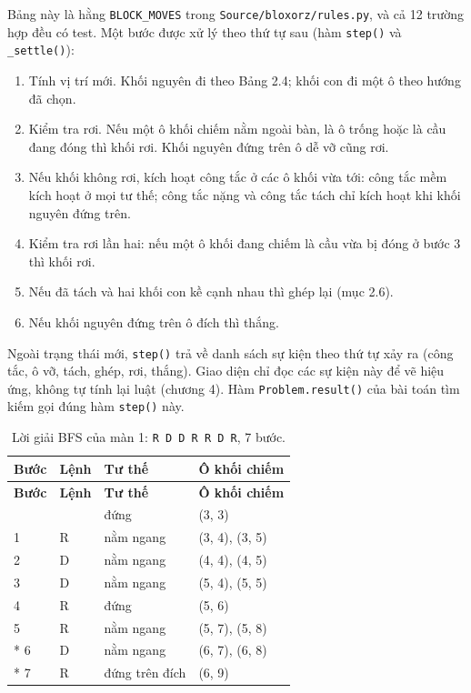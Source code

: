 Bảng này là hằng \texttt{BLOCK\_\allowbreak{}MOVES} trong \texttt{Source/\allowbreak{}bloxorz/\allowbreak{}rules.\allowbreak{}py}, và cả 12 trường hợp đều có test. Một bước được xử lý theo thứ tự sau (hàm \texttt{step()} và \texttt{\_\allowbreak{}settle()}):

\begin{enumerate}
\def\labelenumi{\arabic{enumi}.}
\tightlist
\item
  Tính vị trí mới. Khối nguyên đi theo Bảng 2.4; khối con đi một ô theo hướng đã chọn.
\item
  Kiểm tra rơi. Nếu một ô khối chiếm nằm ngoài bàn, là ô trống hoặc là cầu đang đóng thì khối rơi. Khối nguyên đứng trên ô dễ vỡ cũng rơi.
\item
  Nếu khối không rơi, kích hoạt công tắc ở các ô khối vừa tới: công tắc mềm kích hoạt ở mọi tư thế; công tắc nặng và công tắc tách chỉ kích hoạt khi khối nguyên đứng trên.
\item
  Kiểm tra rơi lần hai: nếu một ô khối đang chiếm là cầu vừa bị đóng ở bước 3 thì khối rơi.
\item
  Nếu đã tách và hai khối con kề cạnh nhau thì ghép lại (mục 2.6).
\item
  Nếu khối nguyên đứng trên ô đích thì thắng.
\end{enumerate}

Ngoài trạng thái mới, \texttt{step()} trả về danh sách sự kiện theo thứ tự xảy ra (công tắc, ô vỡ, tách, ghép, rơi, thắng). Giao diện chỉ đọc các sự kiện này để vẽ hiệu ứng, không tự tính lại luật (chương 4). Hàm \texttt{Problem.\allowbreak{}result()} của bài toán tìm kiếm gọi đúng hàm \texttt{step()} này.

\begin{longtable}[]{@{}llll@{}}
\caption{ Lời giải BFS của màn 1: \texttt{R D D R R D R}, 7 bước.}\tabularnewline
\toprule\noalign{}
\rowcolor{tablehead}\textbf{Bước} & \textbf{Lệnh} & \textbf{Tư thế} & \textbf{Ô khối chiếm} \\
\midrule\noalign{}
\endfirsthead
\toprule\noalign{}
\rowcolor{tablehead}\textbf{Bước} & \textbf{Lệnh} & \textbf{Tư thế} & \textbf{Ô khối chiếm} \\
\midrule\noalign{}
\endhead
\bottomrule\noalign{}
\endlastfoot
0 & & đứng & (3, 3) \\
1 & R & nằm ngang & (3, 4), (3, 5) \\
2 & D & nằm ngang & (4, 4), (4, 5) \\
3 & D & nằm ngang & (5, 4), (5, 5) \\
4 & R & đứng & (5, 6) \\
5 & R & nằm ngang & (5, 7), (5, 8) \\*
6 & D & nằm ngang & (6, 7), (6, 8) \\*
7 & R & đứng trên đích & (6, 9) \\
\end{longtable}


